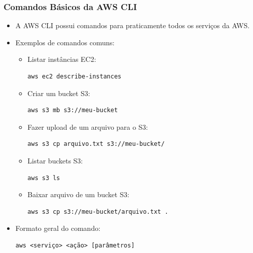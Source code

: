 \documentclass{beamer}
\begin{document}
   \begin{frame}[fragile]
      \frametitle{Comandos Básicos da AWS CLI}
      \begin{itemize}
         \item A AWS CLI possui comandos para praticamente todos os serviços da AWS.
         \item Exemplos de comandos comuns:
         \begin{itemize}
            \item Listar instâncias EC2:
            \begin{verbatim}
aws ec2 describe-instances
            \end{verbatim}
            \item Criar um bucket S3:
            \begin{verbatim}
aws s3 mb s3://meu-bucket
            \end{verbatim}
            \item Fazer upload de um arquivo para o S3:
            \begin{verbatim}
aws s3 cp arquivo.txt s3://meu-bucket/
            \end{verbatim}
            \item Listar buckets S3:
            \begin{verbatim}
aws s3 ls
            \end{verbatim}   
            \item Baixar arquivo de um bucket S3:
            \begin{verbatim}
aws s3 cp s3://meu-bucket/arquivo.txt .
            \end{verbatim}   
         \end{itemize}
         \item Formato geral do comando:
         \begin{verbatim}
aws <serviço> <ação> [parâmetros]   
         \end{verbatim}         
      \end{itemize}
   \end{frame}
\end{document}
